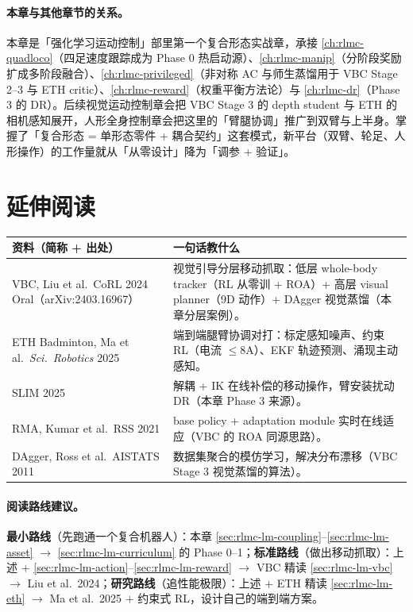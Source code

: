 \paragraph{本章与其他章节的关系。}本章是「强化学习运动控制」部里第一个复合形态实战章，承接 \cref{ch:rlmc-quadloco}（四足速度跟踪成为 Phase 0 热启动源）、\cref{ch:rlmc-manip}（分阶段奖励扩成多阶段融合）、\cref{ch:rlmc-privileged}（非对称 AC 与师生蒸馏用于 VBC Stage 2--3 与 ETH critic）、\cref{ch:rlmc-reward}（权重平衡方法论）与 \cref{ch:rlmc-dr}（Phase 3 的 DR）。后续视觉运动控制章会把 VBC Stage 3 的 depth student 与 ETH 的相机感知展开，人形全身控制章会把这里的「臂腿协调」推广到双臂与上半身。掌握了「复合形态 = 单形态零件 + 耦合契约」这套模式，新平台（双臂、轮足、人形操作）的工作量就从「从零设计」降为「调参 + 验证」。

\section{延伸阅读}
\label{sec:rlmc-lm-further}

\begin{center}
\small
\begin{tabular}{@{}p{6.4cm}p{7.2cm}@{}}
\toprule
资料（简称 + 出处） & 一句话教什么 \\
\midrule
VBC, Liu et al.\ CoRL 2024 Oral（arXiv:2403.16967）\,\cite{liu2024vbc} & 视觉引导分层移动抓取：低层 whole-body tracker（RL 从零训 + ROA）+ 高层 visual planner（9D 动作）+ DAgger 视觉蒸馏（本章分层案例）。 \\
ETH Badminton, Ma et al.\ \textit{Sci.\ Robotics} 2025\,\cite{ma2025badminton} & 端到端腿臂协调对打：标定感知噪声、约束 RL（电流 $\le 8$A）、EKF 轨迹预测、涌现主动感知。 \\
SLIM 2025\,\cite{wang2025slim} & 解耦 + IK 在线补偿的移动操作，臂安装扰动 DR（本章 Phase 3 来源）。 \\
RMA, Kumar et al.\ RSS 2021\,\cite{kumar2021rma} & base policy + adaptation module 实时在线适应（VBC 的 ROA 同源思路）。 \\
DAgger, Ross et al.\ AISTATS 2011\,\cite{ross2011dagger} & 数据集聚合的模仿学习，解决分布漂移（VBC Stage 3 视觉蒸馏的算法）。 \\
\bottomrule
\end{tabular}
\end{center}

\paragraph{阅读路线建议。}\textbf{最小路线}（先跑通一个复合机器人）：本章 \cref{sec:rlmc-lm-coupling}--\cref{sec:rlmc-lm-asset} $\to$ \cref{sec:rlmc-lm-curriculum} 的 Phase 0--1；\textbf{标准路线}（做出移动抓取）：上述 $+$ \cref{sec:rlmc-lm-action}--\cref{sec:rlmc-lm-reward} $\to$ VBC 精读 \cref{sec:rlmc-lm-vbc} $\to$ Liu et al.\ 2024；\textbf{研究路线}（追性能极限）：上述 $+$ ETH 精读 \cref{sec:rlmc-lm-eth} $\to$ Ma et al.\ 2025 $+$ 约束式 RL，设计自己的端到端方案。

